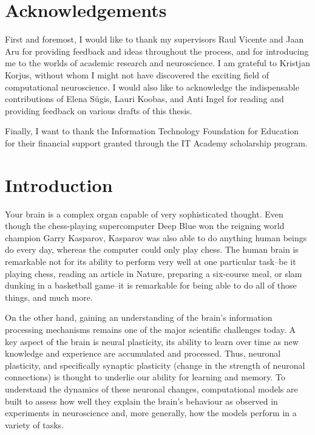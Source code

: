 \documentclass[a4paper,12pt]{report}
\theoremstyle{definition}
\begin{document}
\thispagestyle{empty}
\pagebreak

\chapter*{Acknowledgements}

First and foremost, I would like to thank my supervisors Raul Vicente and Jaan Aru for providing feedback and ideas throughout the process, and for introducing me to the worlds of academic research and neuroscience. I am grateful to Kristjan Korjus, without whom I might not have discovered the exciting field of computational neuroscience. I would also like to acknowledge the indispensable contributions of Elena Sügis, Lauri Koobas, and Anti Ingel for reading and providing feedback on various drafts of this thesis.

Finally, I want to thank the Information Technology Foundation for Education for their financial support granted through the IT Academy scholarship program.


\tableofcontents
\newpage




\chapter*{Introduction}


Your brain is a complex organ capable of very sophisticated thought. Even though the chess-playing supercomputer Deep Blue won the reigning world champion Garry Kasparov, Kasparov was also able to do anything human beings do every day, whereas the computer could only play chess. The human brain is remarkable not for its ability to perform very well at one particular task--be it playing chess, reading an article in Nature, preparing a six-course meal, or slam dunking in a basketball game--it is remarkable for being able to do all of those things, and much more.

On the other hand, gaining an understanding of the brain's information processing mechanisms remains one of the major scientific challenges today. A key aspect of the brain is neural plasticity, its ability to learn over time as new knowledge and experience are accumulated and processed. Thus, neuronal plasticity, and specifically synaptic plasticity (change in the strength of neuronal connections) is thought to underlie our ability for learning and memory. To understand the dynamics of these neuronal changes, computational models are built to assess how well they explain the brain's behaviour as observed in experiments in neuroscience and, more generally, how the models perform in a variety of tasks.
\end{document}
